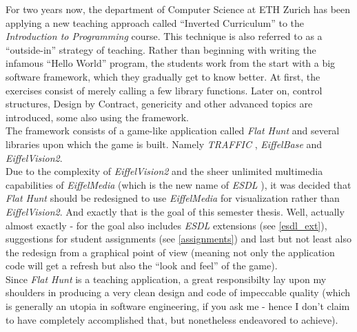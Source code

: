 For two years now, the department of Computer Science at ETH Zurich has been applying a new teaching approach called ``Inverted Curriculum'' \cite{bm03} \cite{mp03} \cite{mk04} to the \emph{Introduction to Programming} course. This technique is also referred to as a ``outside-in'' strategy of teaching. Rather than beginning with writing the infamous ``Hello World'' program, the students work from the start with a big software framework, which they gradually get to know better. At first, the exercises consist of merely calling a few library functions. Later on, control structures, Design by Contract, genericity and other advanced topics are introduced, some also using the framework.\\
The framework consists of a game-like application called \emph{Flat Hunt} and several libraries upon which the game is built. Namely \emph{TRAFFIC} \cite{sa05}, \emph{EiffelBase} and \emph{EiffelVision2}.\\

Due to the complexity of \emph{EiffelVision2} and the sheer unlimited multimedia capabilities of \emph{EiffelMedia} (which is the new name of \emph{ESDL} \cite{bb04} \cite{tgb03} \cite{rb05}), it was decided that \emph{Flat Hunt} should be redesigned to use \emph{EiffelMedia} for visualization rather than \emph{EiffelVision2}. And exactly that is the goal of this semester thesis. Well, actually almost exactly - for the goal also includes \emph{ESDL} extensions (see \autoref{esdl_ext}), suggestions for student assignments (see \autoref{assignments}) and last but not least also the redesign from a graphical point of view (meaning not only the application code will get a refresh but also the ``look and feel'' of the game).\\

Since \emph{Flat Hunt} is a teaching application, a great responsibilty lay upon my shoulders in producing a very clean design and code of impeccable quality (which is generally an utopia in software engineering, if you ask me - hence I don't claim to have completely accomplished that, but nonetheless endeavored to achieve). 
